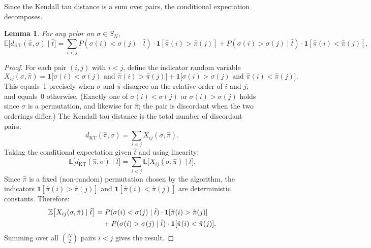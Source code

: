 \documentclass[11pt]{article}
\newtheorem{lemma}{Lemma}
\begin{document}
Since the Kendall tau distance is a sum over pairs, the conditional expectation decomposes.

\begin{lemma}
For any prior on $\sigma \in S_N$,
\begin{equation}
\mathbb{E}\bigl[d_{\mathrm{KT}}(\hat{\pi}, \sigma) \mid \hat{t}\bigr] = \sum_{i < j} P(\sigma(i) < \sigma(j) \mid \hat{t}) \cdot \mathbf{1}[\hat{\pi}(i) > \hat{\pi}(j)] + P(\sigma(i) > \sigma(j) \mid \hat{t}) \cdot \mathbf{1}[\hat{\pi}(i) < \hat{\pi}(j)].
\end{equation}
\end{lemma}

\begin{proof}
For each pair $(i, j)$ with $i < j$, define the indicator random variable
\begin{equation}
X_{ij}(\sigma, \hat{\pi}) = \mathbf{1}\bigl[\sigma(i) < \sigma(j) \text{ and } \hat{\pi}(i) > \hat{\pi}(j)\bigr] + \mathbf{1}\bigl[\sigma(i) > \sigma(j) \text{ and } \hat{\pi}(i) < \hat{\pi}(j)\bigr].
\end{equation}
This equals~1 precisely when $\sigma$ and $\hat{\pi}$ disagree on the relative order of $i$ and $j$, and equals~0 otherwise. (Exactly one of $\sigma(i) < \sigma(j)$ or $\sigma(i) > \sigma(j)$ holds since $\sigma$ is a permutation, and likewise for $\hat{\pi}$; the pair is discordant when the two orderings differ.) The Kendall tau distance is the total number of discordant pairs:
\begin{equation}
d_{\mathrm{KT}}(\hat{\pi}, \sigma) = \sum_{i < j} X_{ij}(\sigma, \hat{\pi}).
\end{equation}
Taking the conditional expectation given $\hat{t}$ and using linearity:
\begin{equation}
\mathbb{E}\bigl[d_{\mathrm{KT}}(\hat{\pi}, \sigma) \mid \hat{t}\bigr] = \sum_{i < j} \mathbb{E}\bigl[X_{ij}(\sigma, \hat{\pi}) \mid \hat{t}\bigr].
\end{equation}
Since $\hat{\pi}$ is a fixed (non-random) permutation chosen by the algorithm, the indicators $\mathbf{1}[\hat{\pi}(i) > \hat{\pi}(j)]$ and $\mathbf{1}[\hat{\pi}(i) < \hat{\pi}(j)]$ are deterministic constants. Therefore:
\begin{align}
\mathbb{E}\bigl[X_{ij}(\sigma, \hat{\pi}) \mid \hat{t}\bigr]
&= P(\sigma(i) < \sigma(j) \mid \hat{t}) \cdot \mathbf{1}[\hat{\pi}(i) > \hat{\pi}(j)] \notag \\
&\quad + P(\sigma(i) > \sigma(j) \mid \hat{t}) \cdot \mathbf{1}[\hat{\pi}(i) < \hat{\pi}(j)].
\end{align}
Summing over all $\binom{N}{2}$ pairs $i < j$ gives the result.
\end{proof}
\end{document}

